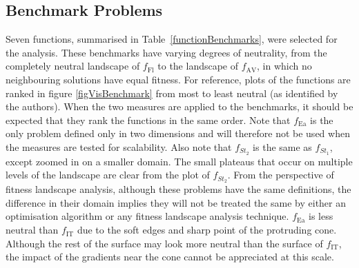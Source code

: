 \documentclass[conference]{IEEEtran}
\begin{document}
\subsection{Benchmark Problems}
\label{visualBenchmarks}
Seven functions, summarised in Table~\ref{functionBenchmarks}, were selected for the analysis. These benchmarks have varying degrees of neutrality, from the completely neutral landscape of $f_{\text{Fl}}$  to the landscape of $f_{\text{AV}}$, in which no neighbouring solutions have equal fitness. For reference, plots of the functions are ranked in figure \ref{figVisBenchmark} from most to least neutral (as identified by the authors). When the two measures are applied to the benchmarks, it should be expected that they rank the functions in the same order. Note that $f_{\text{Ea}}$ is the only problem defined only in two dimensions and will therefore not be used when the measures are tested for scalability. Also note that $f_{\textit{St}_2}$ is the same as $f_{\textit{St}_1}$, except zoomed in on a smaller domain. The small plateaus that occur on multiple levels of the landscape are clear from the plot of $f_{\textit{St}_2}$. From the perspective of fitness landscape analysis, although these problems have the same definitions, the difference in their domain implies they will not be treated the same by either an optimisation algorithm or any fitness landscape analysis technique. $f_{\text{Ea}}$ is less neutral than $f_{\text{IT}}$ due to the soft edges and sharp point of the protruding cone. Although the rest of the surface may look more neutral than the surface of $f_{\text{IT}}$, the impact of the gradients near the cone cannot be appreciated at this scale.
\end{document}
